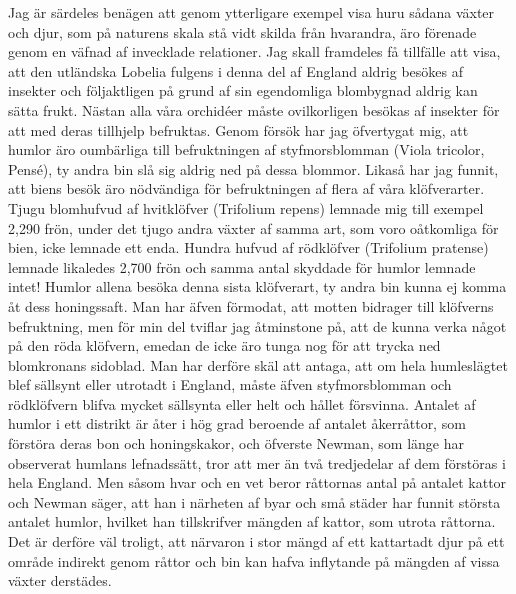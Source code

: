 Jag är särdeles benägen att genom ytterligare exempel visa huru sådana växter och djur, som på naturens skala stå vidt skilda från hvarandra, äro förenade genom en väfnad af invecklade relationer. Jag skall framdeles få tillfälle att visa, att den utländska Lobelia fulgens i denna del af England aldrig besökes af insekter och följaktligen på grund af sin egendomliga blombygnad aldrig kan sätta frukt. Nästan alla våra orchidéer måste ovilkorligen besökas af insekter för att med deras tillhjelp befruktas. Genom försök har jag öfvertygat mig, att humlor äro oumbärliga till befruktningen af styfmorsblomman (Viola tricolor, Pensé), ty andra bin slå sig aldrig ned på dessa blommor. Likaså har jag funnit, att biens besök äro nödvändiga för befruktningen af flera af våra klöfverarter. Tjugu blomhufvud af hvitklöfver (Trifolium repens) lemnade mig till exempel 2,290 frön, under det tjugo andra växter af samma art, som voro oåtkomliga för bien, icke lemnade ett enda. Hundra hufvud af rödklöfver (Trifolium pratense) lemnade likaledes 2,700 frön och samma antal skyddade för humlor lemnade intet! Humlor allena besöka denna sista klöfverart, ty andra bin kunna ej komma åt dess honingssaft. Man har äfven förmodat, att motten bidrager till klöfverns befruktning, men för min del tviflar jag åtminstone på, att de kunna verka något på den röda klöfvern, emedan de icke äro tunga nog för att trycka ned blomkronans sidoblad. Man har derföre skäl att antaga, att om hela humleslägtet blef sällsynt eller utrotadt i England, måste äfven styfmorsblomman och rödklöfvern blifva mycket sällsynta eller helt och hållet försvinna. Antalet af humlor i ett distrikt är åter i hög grad beroende af antalet åkerråttor, som förstöra deras bon och honingskakor, och öfverste Newman, som länge har observerat humlans lefnadssätt, tror att mer än två tredjedelar af dem förstöras i hela England. Men såsom hvar och en vet beror råttornas antal på antalet kattor och Newman säger, att han i närheten af byar och små städer har funnit största antalet humlor, hvilket han tillskrifver mängden af kattor, som utrota råttorna. Det är derföre väl troligt, att närvaron i stor mängd af ett kattartadt djur på ett område indirekt genom råttor och bin kan hafva inflytande på mängden af vissa växter derstädes.

